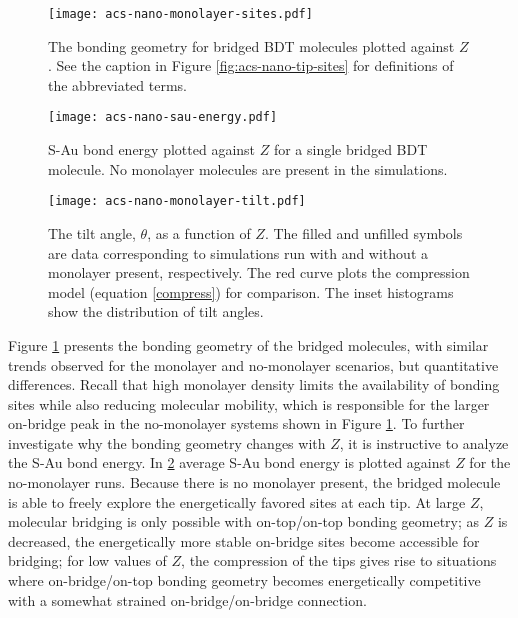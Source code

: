 \documentclass[10pt]{report}  %
\begin{document}
\begin{figure}[t!]
	\centering
	\texttt{[image: acs-nano-monolayer-sites.pdf]}
	\caption{ The bonding geometry for bridged BDT molecules plotted against $Z$.  See the caption in Figure \ref{fig:acs-nano-tip-sites} for definitions of the abbreviated terms.}
	\label{fig:acs-nano-monolayer-sites}
\end{figure}

\begin{figure}[h!]
	\centering
	\texttt{[image: acs-nano-sau-energy.pdf]}
	\caption{S-Au bond energy plotted against $Z$ for a single bridged BDT molecule. No monolayer molecules are present in the simulations.}
	\label{fig:acs-nano-sau-energy}
\end{figure}

\begin{figure}[h!]
	\centering
	\texttt{[image: acs-nano-monolayer-tilt.pdf]}
	\caption{The tilt angle, $\theta$, as a function of $Z$. The filled and unfilled symbols are data corresponding to simulations run with and without a monolayer present, respectively.  The red curve plots the compression model (equation \ref{compress}) for comparison.  The inset histograms show the distribution of tilt angles.}
	\label{fig:acs-nano-monolayer-tilt}
\end{figure}

Figure \ref{fig:acs-nano-monolayer-sites} presents the bonding geometry of the bridged molecules, with similar trends observed for the monolayer and no-monolayer scenarios, but quantitative differences.  Recall that high monolayer density limits the availability of bonding sites while also reducing molecular mobility, which is responsible for the larger on-bridge peak in the no-monolayer systems shown in Figure \ref{fig:acs-nano-monolayer-sites}.  To further investigate why the bonding geometry changes with $Z$, it is instructive to analyze the S-Au bond energy.  In \ref{fig:acs-nano-sau-energy} average S-Au bond energy is plotted against $Z$ for the no-monolayer runs.  Because there is no monolayer present, the bridged molecule is able to freely explore the energetically favored sites at each tip.  At large $Z$, molecular bridging is only possible with on-top/on-top bonding geometry; as $Z$ is decreased, the energetically more stable on-bridge sites become accessible for bridging; for low values of $Z$, the compression of the tips gives rise to situations where on-bridge/on-top bonding geometry becomes energetically competitive with a somewhat strained on-bridge/on-bridge connection.
\end{document}
